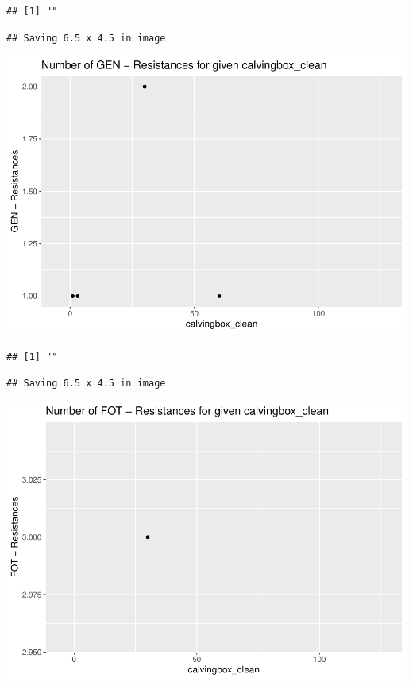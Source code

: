 \documentclass[
]{article}
\begin{document}
\begin{verbatim}
## [1] ""
\end{verbatim}

\begin{verbatim}
## Saving 6.5 x 4.5 in image
\end{verbatim}

\includegraphics{NResistenzen_files/figure-latex/numerical_variables-24.pdf}

\begin{verbatim}
## [1] ""
\end{verbatim}

\begin{verbatim}
## Saving 6.5 x 4.5 in image
\end{verbatim}

\includegraphics{NResistenzen_files/figure-latex/numerical_variables-25.pdf}
\end{document}
